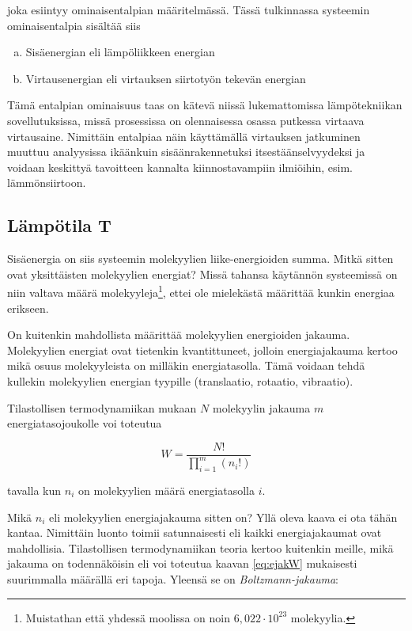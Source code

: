 \documentclass[12pt,a4paper,finnish]{book}
\begin{document}
joka esiintyy ominaisentalpian määritelmässä. Tässä tulkinnassa systeemin ominaisentalpia sisältää siis

\begin{enumerate}[a)]
 \item Sisäenergian eli lämpöliikkeen energian
 \item Virtausenergian eli virtauksen siirtotyön tekevän energian
\end{enumerate}

Tämä entalpian ominaisuus taas on kätevä niissä lukemattomissa lämpötekniikan sovellutuksissa, missä prosessissa on 
olennaisessa osassa putkessa virtaava virtausaine. Nimittäin entalpiaa näin käyttämällä virtauksen jatkuminen muuttuu 
analyysissa ikäänkuin sisäänrakennetuksi itsestäänselvyydeksi ja voidaan keskittyä tavoitteen kannalta kiinnostavampiin 
ilmiöihin, esim. lämmönsiirtoon.

\subsection{Lämpötila T} \label{sssection:T} %

Sisäenergia on siis systeemin molekyylien liike-energioiden summa. Mitkä sitten ovat yksittäisten molekyylien energiat? 
Missä tahansa käytännön systeemissä on niin valtava määrä molekyyleja\footnote{Muistathan että yhdessä moolissa on 
noin $6,022\cdot10^{23}$ molekyylia.}, ettei ole mielekästä määrittää kunkin energiaa erikseen.

On kuitenkin mahdollista määrittää molekyylien energioiden jakauma. Molekyylien energiat ovat tietenkin kvantittuneet, 
jolloin energiajakauma kertoo mikä osuus molekyyleista on milläkin energiatasolla. Tämä voidaan tehdä kullekin molekyylien 
energian tyypille (translaatio, rotaatio, vibraatio).

Tilastollisen termodynamiikan mukaan $N$ molekyylin jakauma $m$ energiatasojoukolle voi toteutua

\begin{equation}
\label{eq:ejakW}
 W = \frac{N!}{\prod_{i=1}^m(n_i!)}
\end{equation}

tavalla kun $n_i$ on molekyylien määrä energiatasolla $i$.

Mikä $n_i$ eli molekyylien energiajakauma sitten on? Yllä oleva kaava ei ota tähän kantaa. 
Nimittäin luonto toimii satunnaisesti eli kaikki energiajakaumat ovat mahdollisia. Tilastollisen termodynamiikan 
teoria kertoo kuitenkin meille, mikä jakauma on todennäköisin eli voi toteutua kaavan \ref{eq:ejakW} mukaisesti 
suurimmalla määrällä eri tapoja. Yleensä se on \textit{Boltzmann-jakauma}:
\end{document}
